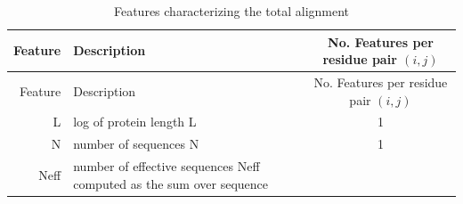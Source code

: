 \documentclass[12pt,a4paper,twoside]{book}
\theoremstyle{definition}
\theoremstyle{definition}
\theoremstyle{remark}
\begin{document}
\begin{longtable}[]{@{}rlc@{}}
\caption{Features characterizing the total alignment}\tabularnewline
\toprule
\begin{minipage}[b]{0.23\columnwidth}\raggedleft\strut
Feature\strut
\end{minipage} & \begin{minipage}[b]{0.50\columnwidth}\raggedright\strut
Description\strut
\end{minipage} & \begin{minipage}[b]{0.18\columnwidth}\centering\strut
No. Features per residue pair \((i, j)\)\strut
\end{minipage}\tabularnewline
\midrule
\endfirsthead
\toprule
\begin{minipage}[b]{0.23\columnwidth}\raggedleft\strut
Feature\strut
\end{minipage} & \begin{minipage}[b]{0.50\columnwidth}\raggedright\strut
Description\strut
\end{minipage} & \begin{minipage}[b]{0.18\columnwidth}\centering\strut
No. Features per residue pair \((i, j)\)\strut
\end{minipage}\tabularnewline
\midrule
\endhead
\begin{minipage}[t]{0.23\columnwidth}\raggedleft\strut
L\strut
\end{minipage} & \begin{minipage}[t]{0.50\columnwidth}\raggedright\strut
log of protein length L\strut
\end{minipage} & \begin{minipage}[t]{0.18\columnwidth}\centering\strut
1\strut
\end{minipage}\tabularnewline
\begin{minipage}[t]{0.23\columnwidth}\raggedleft\strut
N\strut
\end{minipage} & \begin{minipage}[t]{0.50\columnwidth}\raggedright\strut
number of sequences N\strut
\end{minipage} & \begin{minipage}[t]{0.18\columnwidth}\centering\strut
1\strut
\end{minipage}\tabularnewline
\begin{minipage}[t]{0.23\columnwidth}\raggedleft\strut
Neff\strut
\end{minipage} & \begin{minipage}[t]{0.50\columnwidth}\raggedright\strut
number of effective sequences Neff computed as the sum over sequence

\end{minipage}
\end{longtable}
\end{document}
